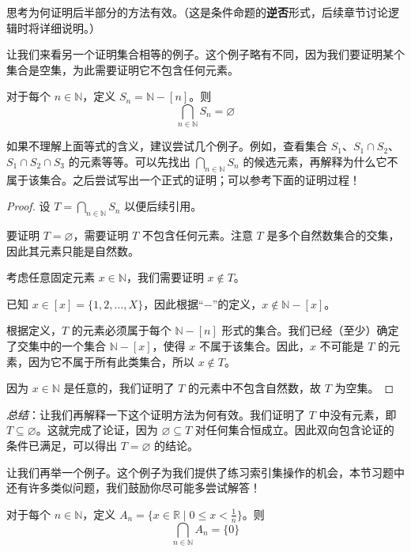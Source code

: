 思考为何证明后半部分的方法有效。（这是条件命题的\textbf{逆否}形式，后续章节讨论逻辑时将详细说明。）

让我们来看另一个证明集合相等的例子。这个例子略有不同，因为我们要证明某个集合是空集，为此需要证明它不包含任何元素。

\begin{proposition}
    对于每个 $n \in \mathbb{N}$，定义 $S_n = \mathbb{N}-[n]$。则
    \[\bigcap_{n \in \mathbb{N}}S_n = \varnothing\]
\end{proposition}

如果不理解上面等式的含义，建议尝试几个例子。例如，查看集合 $S_1$、$S_1 \cap S_2$、$S_1 \cap S_2 \cap S_3$ 的元素等等。可以先找出 $\bigcap_{n \in \mathbb{N}}S_n$ 的候选元素，再解释为什么它不属于该集合。之后尝试写出一个正式的证明；可以参考下面的证明过程！

\begin{proof}
    设 $T = \bigcap_{n \in \mathbb{N}}S_n$ 以便后续引用。

    要证明 $T = \varnothing$，需要证明 $T$ 不包含任何元素。注意 $T$ 是多个自然数集合的交集，因此其元素只能是自然数。

    考虑任意固定元素 $x \in \mathbb{N}$，我们需要证明 $x \notin T$。

    已知 $x \in [x] = \{1,2,\dots, X\}$，因此根据``$-$''的定义，$x \notin \mathbb{N}-[x]$。

    根据定义，$T$ 的元素必须属于每个 $\mathbb{N} - [n]$ 形式的集合。我们已经（至少）确定了交集中的一个集合 $\mathbb{N} - [x]$，使得 $x$ 不属于该集合。因此，$x$ 不可能是 $T$ 的元素，因为它不属于所有此类集合，所以 $x \notin T$。

    因为 $x \in \mathbb{N}$ 是任意的，我们证明了 $T$ 的元素中不包含自然数，故 $T$ 为空集。
\end{proof}

\emph{总结}：让我们再解释一下这个证明方法为何有效。我们证明了 $T$ 中没有元素，即 $T \subseteq \varnothing$。这就完成了论证，因为 $\varnothing \subseteq T$ 对任何集合恒成立。因此双向包含论证的条件已满足，可以得出 $T = \varnothing$ 的结论。

让我们再举一个例子。这个例子为我们提供了练习索引集操作的机会，本节习题中还有许多类似问题，我们鼓励你尽可能多尝试解答！

\begin{proposition}
    对于每个 $n \in \mathbb{N}$，定义 $A_n = \{x \in \mathbb{R} \mid 0 \le x < \frac{1}{n}\}$。则
    \[\bigcap_{n \in \mathbb{N}}A_n = \{0\}\]
\end{proposition}

